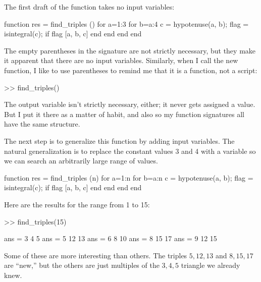 \documentclass[
]{book}
\numberwithin{Answer}{chapter}
\numberwithin{Exercise}{chapter}
\begin{document}
The first draft of the function takes no input variables:

\begin{code}
function res = find_triples ()
    for a=1:3
        for b=a:4
            c = hypotenuse(a, b);
            flag = isintegral(c);
            if flag
                [a, b, c]
            end
        end
    end
end
\end{code}

The empty parentheses in the signature are not strictly necessary, but
they make it apparent that there are no input variables.  Similarly,
when I call the new function, I like to use parentheses to remind me
that it is a function, not a script:

\begin{code}
>> find_triples()
\end{code}

The output variable isn't strictly necessary, either; it
never gets assigned a value.  But I put it there as a matter of
habit, and also so my function signatures all have the same structure.

The next step is to generalize this function by adding input
variables.  The natural generalization is to replace the constant
values 3 and 4 with a variable so we can search an arbitrarily large
range of values.

\begin{code}
function res = find_triples (n)
    for a=1:n
        for b=a:n
            c = hypotenuse(a, b);
            flag = isintegral(c);
            if flag
                [a, b, c]
            end
        end
    end
end
\end{code}

Here are the results for the range from 1 to 15:

\begin{code}
>> find_triples(15)

ans = 3     4     5
ans = 5    12    13
ans = 6     8    10
ans = 8    15    17
ans = 9    12    15
\end{code}

Some of these are more interesting than others.  The triples
$5,12,13$ and $8,15,17$ are ``new,'' but the others are just
multiples of the $3,4,5$ triangle we already knew.
\end{document}
